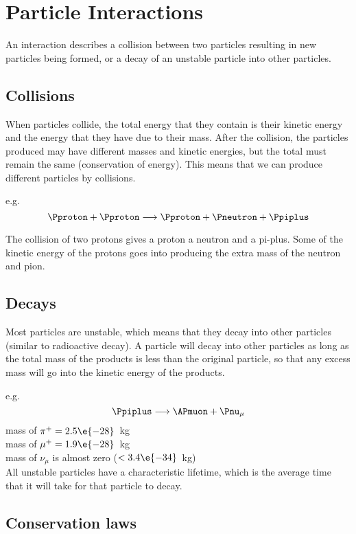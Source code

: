 \section{Particle Interactions}

An interaction describes a collision between two particles resulting in new particles being formed, or a decay of an unstable particle into other particles.  

\subsection{Collisions}

When particles collide, the total energy that they contain is their kinetic energy and the energy that they have due to their mass.  After the collision, the particles produced may have different masses and kinetic energies, but the total must remain the same (conservation of energy).  This means that we can produce different particles by collisions.

e.g.\[\Pproton+\Pproton\longrightarrow\Pproton+\Pneutron+\Ppiplus\]

The collision of two protons gives a proton a neutron and a pi-plus.  Some of the kinetic energy of the protons goes into producing the extra mass of the neutron and pion.

\subsection{Decays}

Most particles are unstable, which means that they decay into other particles (similar to radioactive decay).  A particle will decay into other particles as long as the total mass of the products is less than the original particle, so that any excess mass will go into the kinetic energy of the products.

e.g.\ \[\Ppiplus\longrightarrow\APmuon+\Pnu_{\mu}\]
mass of $\pi^{+} = 2.5\e{-28}$~kg\\
mass of $\mu^{+} = 1.9\e{-28}$~kg\\
mass of $\nu_{\mu}$ is almost zero ($<3.4\e{-34}$~kg)\\


All unstable particles have a characteristic lifetime, which is the average time that it will take for that particle to decay.  

\subsection{Conservation laws}

